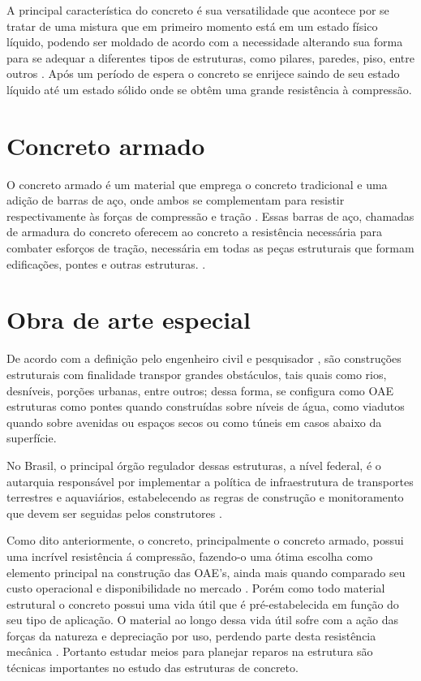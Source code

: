 A principal característica do concreto é sua versatilidade que acontece por se tratar de uma mistura que em primeiro momento está em um estado físico líquido, podendo ser moldado de acordo com a necessidade alterando sua forma para se adequar a diferentes tipos de estruturas, como pilares, paredes, piso, entre outros \cite{Gagg2014}. Após um período de espera o concreto se enrijece saindo de seu estado líquido até um estado sólido onde se obtêm uma grande resistência à compressão.


\section{Concreto armado}

O concreto armado é um material que emprega o concreto tradicional e uma adição de barras de aço, onde ambos se complementam para resistir respectivamente às forças de compressão e tração \cite{Lima2014}. 
Essas barras de aço, chamadas de armadura do concreto oferecem ao concreto a resistência necessária para combater esforços de tração, necessária em todas as peças estruturais que formam edificações, pontes e outras estruturas. \cite{pinheiro2010estruturas}.

\section{Obra de arte especial}

De acordo com a definição pelo engenheiro civil e pesquisador ,  são construções estruturais com finalidade transpor grandes obstáculos, tais quais como rios, desníveis, porções urbanas, entre outros; dessa forma, se configura como OAE estruturas como pontes quando construídas sobre níveis de água, como viadutos quando sobre avenidas ou espaços secos ou como túneis em casos abaixo da superfície.

No Brasil, o principal órgão regulador dessas estruturas, a nível federal, é o  autarquia responsável por implementar a política de infraestrutura de transportes terrestres e aquaviários,
estabelecendo as regras de construção e monitoramento que devem ser seguidas pelos construtores \cite{dnitdados}.

Como dito anteriormente, o concreto, principalmente o concreto armado, possui uma incrível resistência á compressão, fazendo-o uma ótima escolha como elemento principal na construção das OAE's, ainda mais quando comparado seu custo operacional e disponibilidade no mercado \cite{santos2008armaccao}. 
Porém como todo material estrutural o concreto possui uma vida útil que é pré-estabelecida em função do seu tipo de aplicação. O material ao longo dessa vida útil sofre com a ação das forças da natureza e depreciação por uso, perdendo parte desta resistência mecânica \cite{santos2008armaccao}. Portanto estudar meios para planejar reparos na estrutura são técnicas importantes no estudo das estruturas de concreto.

